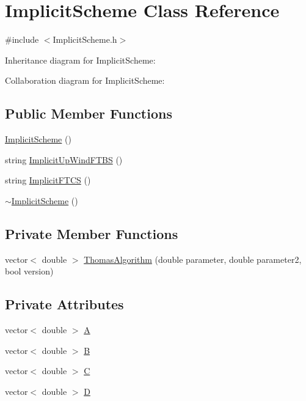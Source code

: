 \hypertarget{class_implicit_scheme}{}\section{Implicit\+Scheme Class Reference}
\label{class_implicit_scheme}


{\ttfamily \#include $<$Implicit\+Scheme.\+h$>$}



Inheritance diagram for Implicit\+Scheme\+:


Collaboration diagram for Implicit\+Scheme\+:
\subsection*{Public Member Functions}
\begin{DoxyCompactItemize}
\item 
\mbox{\hyperlink{class_implicit_scheme_a7bb3a64ab8d7ca0b58ed4ba9817b8c12}{Implicit\+Scheme}} ()
\item 
string \mbox{\hyperlink{class_implicit_scheme_ab8311a005d69690622e0ddaa0dcff94d}{Implicit\+Up\+Wind\+F\+T\+BS}} ()
\item 
string \mbox{\hyperlink{class_implicit_scheme_afd2b8e73e914a04c326b8cba0d5810ce}{Implicit\+F\+T\+CS}} ()
\item 
\mbox{\hyperlink{class_implicit_scheme_aca61347d2335e248678f7f3060785762}{$\sim$\+Implicit\+Scheme}} ()
\end{DoxyCompactItemize}
\subsection*{Private Member Functions}
\begin{DoxyCompactItemize}
\item 
vector$<$ double $>$ \mbox{\hyperlink{class_implicit_scheme_a2f0cee270b60bc42f8f5e864255f5e29}{Thomas\+Algorithm}} (double parameter, double parameter2, bool version)
\end{DoxyCompactItemize}
\subsection*{Private Attributes}
\begin{DoxyCompactItemize}
\item 
vector$<$ double $>$ \mbox{\hyperlink{class_implicit_scheme_a9bd3d0a458683f9a17e8d11016c9f879}{A}}
\item 
vector$<$ double $>$ \mbox{\hyperlink{class_implicit_scheme_affeedb3fe9f7ebb8be113c884dd09a97}{B}}
\item 
vector$<$ double $>$ \mbox{\hyperlink{class_implicit_scheme_ab9059b52250e0afdd41b855299e6cf71}{C}}
\item 
vector$<$ double $>$ \mbox{\hyperlink{class_implicit_scheme_a30dad74ec599966b5ba7965f382d28cb}{D}}
\end{DoxyCompactItemize}
